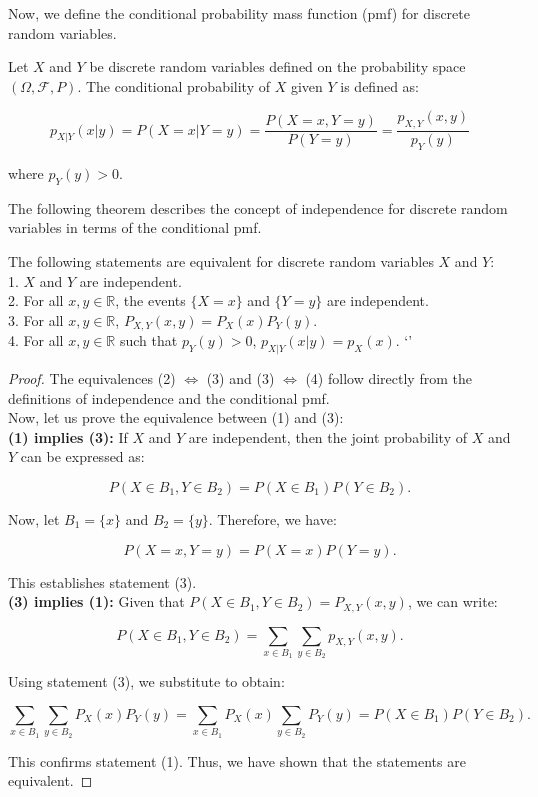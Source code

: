 Now, we define the conditional probability mass function (pmf) for discrete random variables.\\

\begin{definition}
    Let \(X\) and \(Y\) be discrete random variables defined on the probability space \((\Omega, \mathcal{F}, P)\). The conditional probability of \(X\) given \(Y\) is defined as:

\[
p_{X|Y}(x|y) = P(X = x | Y = y) = \frac{P(X = x, Y = y)}{P(Y = y)} = \frac{p_{X,Y}(x, y)}{p_Y(y)}
\]

where \(p_Y(y) > 0\).
\end{definition}

The following theorem describes the concept of independence for discrete random variables in terms of the conditional pmf.

\begin{theorem}
    The following statements are equivalent for discrete random variables \(X\) and \(Y\):\\

1. \(X\) and \(Y\) are independent.\\
2. For all \(x, y \in \mathbb{R}\), the events \(\{X = x\}\) and \(\{Y = y\}\) are independent.\\
3. For all \(x, y \in \mathbb{R}\), \(P_{X,Y}(x, y) = P_X(x)P_Y(y)\).\\
4. For all \(x, y \in \mathbb{R}\) such that \(p_Y(y) > 0\), \(p_{X|Y}(x|y) = p_X(x)\).
`'
\end{theorem}

\begin{proof}
    
The equivalences (2) $\Leftrightarrow$ (3) and (3) $\Leftrightarrow$ (4) follow directly from the definitions of independence and the conditional pmf. \\

Now, let us prove the equivalence between (1) and (3):\\

\textbf{(1) implies (3):} If \(X\) and \(Y\) are independent, then the joint probability of \(X\) and \(Y\) can be expressed as:

\[
P(X \in B_1, Y \in B_2) = P(X \in B_1) P(Y \in B_2).
\]

Now, let \(B_1 = \{x\}\) and \(B_2 = \{y\}\). Therefore, we have:

\[
P(X = x, Y = y) = P(X = x) P(Y = y).
\]

This establishes statement (3).\\

\textbf{(3) implies (1):} Given that \(P(X \in B_1, Y \in B_2) = P_{X,Y}(x,y)\), we can write:

\[
P(X \in B_1, Y \in B_2) = \sum_{x \in B_1} \sum_{y \in B_2} p_{X,Y}(x, y).
\]

Using statement (3), we substitute to obtain:

\[
\sum_{x \in B_1} \sum_{y \in B_2} P_X(x) P_Y(y) = \sum_{x \in B_1} P_X(x) \sum_{y \in B_2} P_Y(y) = P(X \in B_1) P(Y \in B_2).
\]

This confirms statement (1). Thus, we have shown that the statements are equivalent.
\end{proof}

